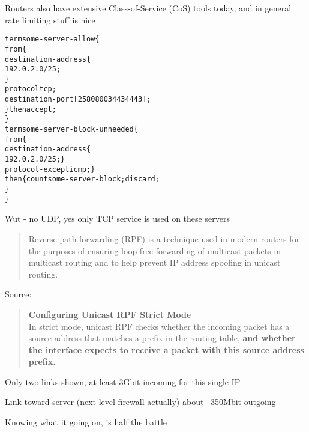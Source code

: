 \documentclass[Screen16to9,17pt]{foils}
\begin{document}
Routers also have extensive Class-of-Service (CoS) tools today, and in general rate limiting stuff is nice


\begin{alltt}\footnotesize
term some-server-allow \{
    from \{
        destination-address \{
            192.0.2.0/25;
        \}
        protocol tcp;
        destination-port [ 25 80 8003 443 4443 ];
    \} then accept;
\}
term some-server-block-unneeded \{
    from \{
        destination-address \{
            192.0.2.0/25; \}
        protocol-except icmp;  \}
    then \{ count some-server-block; discard;
    \}
\}
\end{alltt}

Wut - no UDP, yes only TCP service is used on these servers





\begin{quote}
Reverse path forwarding (RPF) is a technique used in modern routers for the purposes of ensuring loop-free forwarding of multicast packets in multicast routing and to help prevent IP address spoofing in unicast routing.
\end{quote}
Source: 

\begin{quote}
{\bf Configuring Unicast RPF Strict Mode}\\
In strict mode, unicast RPF checks whether the incoming packet has a source address that matches a prefix in the routing table, {\bf and whether the interface expects to receive a packet with this source address prefix.}
\end{quote}









\centerline{Only two links shown, at least 3Gbit incoming for this single IP}


\begin{list1}
\item Link toward server (next level firewall actually) about ~350Mbit outgoing
\item Knowing what it going on, is half the battle
\end{list1}
\end{document}
